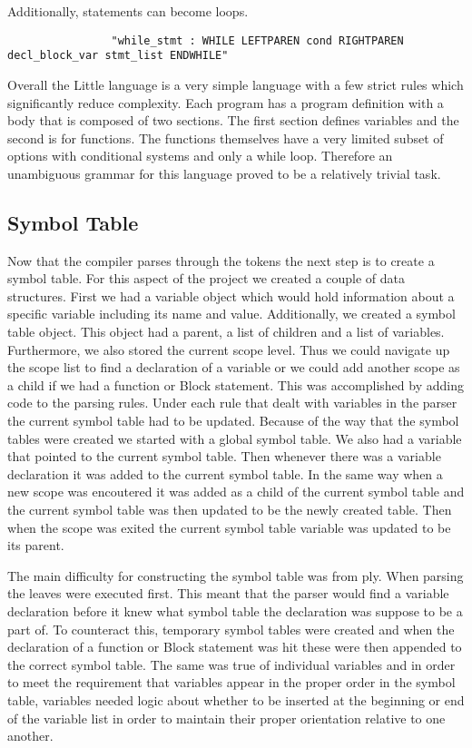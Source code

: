 \documentclass[12pt]{article}
\begin{document}
           Additionally, statements can become loops.
           \begin{verbatim}
				"while_stmt : WHILE LEFTPAREN cond RIGHTPAREN decl_block_var stmt_list ENDWHILE"
           \end{verbatim}
           
    		
    		Overall the Little language is a very simple language with a few strict rules which significantly reduce complexity.  Each program has a program definition with a body that is composed of two sections.  The first section defines variables and the second is for functions.  The functions themselves have a very limited subset of options with conditional systems and only a while loop.  Therefore an unambiguous grammar for this language proved to be a relatively trivial task.  
    		

    	\subsection{Symbol Table}
    		Now that the compiler parses through the tokens the next step is to create a symbol table.  For this aspect of the project we created a couple of data structures.  First we had a variable object which would hold information about a specific variable including its name and value.  Additionally, we created a symbol table object.  This object had a parent, a list of children and a list of variables.  Furthermore, we also stored the current scope level.  Thus we could navigate up the scope list to find a declaration of a variable or we could add another scope as a child if we had a function or Block statement.  
    		This was accomplished by adding code to the parsing rules.  Under each rule that dealt with variables in the parser the current symbol table had to be updated.  Because of the way that the symbol tables were created we started with a global symbol table.  We also had a variable that pointed to the current symbol table.  Then whenever there was a variable declaration it was added to the current symbol table.  In the same way when a new scope was encoutered it was added as a child of the current symbol table and the current symbol table was then updated to be the newly created table.  Then when the scope was exited the current symbol table variable was updated to be its parent. 
    		
    		The main difficulty for constructing the symbol table was from ply.  When parsing the leaves were executed first.  This meant that the parser would find a variable declaration before it knew what symbol table the declaration was suppose to be a part of.   To counteract this, temporary symbol tables were created and when the declaration of a function or Block statement was hit these were then appended to the correct symbol table.  The same was true of individual variables and in order to meet the requirement that variables appear in the proper order in the symbol table, variables needed logic about whether to be inserted at the beginning or end of the variable list in order to maintain their proper orientation relative to one another.
\end{document}
